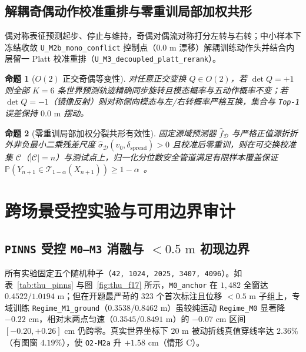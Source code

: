 \documentclass[UTF8,a4paper,12pt,openany,oneside]{ctexrep}
\newtheorem{proposition}{命题}[chapter]
\begin{document}
\section{解耦奇偶动作校准重排与零重训局部加权共形}
偶对称表征预测起步、停止与维持，奇偶对偶流对称打分左转与右转；中小样本下冻结收敛 \texttt{U\_M2b\_mono\_conflict} 控制点（$0.0\text{ m}$ 漂移）解耦训练动作头并结合内层留一 Platt 校准重排（\texttt{U\_M3\_decoupled\_platt\_rerank}）。

\begin{proposition}[$O(2)$ 正交奇偶等变性]
对任意正交变换 $Q\in O(2)$，若 $\det Q=+1$ 则全部 $K=6$ 条世界预测轨迹精确同步旋转且模态概率与五动作概率不变；若 $\det Q=-1$（镜像反射）则对称侧向模态与左/右转概率严格互换，集合与 \texttt{Top-1} 误差保持 $0.0\text{ m}$ 摆动。
\end{proposition}

\begin{proposition}[零重训局部加权分裂共形有效性]
固定源域预测器 $\hat{f}_{\mathcal{D}}$ 与严格正值源折折外非负最小二乘残差尺度 $\hat{\sigma}_{\mathcal{D}}(v_0,\delta_{\text{spread}})>0$ 且校准后零重训，则在可交换校准集 $\mathcal{C}$（$|\mathcal{C}|=n$）与测试点上，归一化分位数安全管道满足有限样本覆盖保证 $\mathbb{P}(Y_{n+1}\in\mathcal{T}_{1-\alpha}(X_{n+1}))\ge 1-\alpha$~\cite{lei2018conformal,lindemann2023conformal}。
\end{proposition}

\chapter{跨场景受控实验与可用边界审计}
\section{\texttt{PINNS} 受控 \texttt{M0--M3} 消融与 $<0.5\text{ m}$ 初现边界}
所有实验固定五个随机种子（\texttt{42, 1024, 2025, 3407, 4096}）。如表~\ref{tab:thu_pinns} 与图~\ref{fig:thu_f17} 所示，\texttt{M0\_anchor} 在 $1{,}482$ 全窗达 $0.4522 / 1.0194\text{ m}$；但在开题最严苛的 $323$ 个首次标注且位移 $<0.5\text{ m}$ 子组上，专域训练 \texttt{Regime\_M1\_ground}（$0.3538 / 0.8462\text{ m}$）虽较纯运动 \texttt{Regime\_M0} 显著降 $-0.22\text{ cm}$，相对末两点匀速（$0.3545 / 0.8491\text{ m}$）的 $-0.07\text{ cm}$ 区间 $[-0.20, +0.26]\text{ cm}$ 仍跨零。真实世界坐标下 $20\text{ m}$ 被动折线真值穿线率达 $2.36\%$（有图窗 $4.19\%$），使 \texttt{O2-M2a} 升 $+1.58\text{ cm}$（情形 C）。
\end{document}
